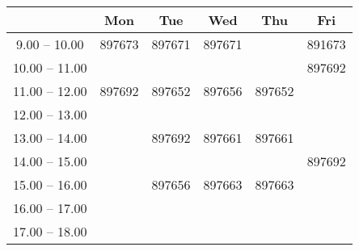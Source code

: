 \documentclass[12pt, a4paper]{article}
\begin{document}
\thispagestyle{empty}
\begin{tabular}{|c|c|c|c|c|c|}
	\hline
	& Mon & Tue & Wed & Thu & Fri \\
	\hline
	9.00 -- 10.00 & 897673 & 897671 & 897671 & & 891673 \\
	\cline{1-1} \cline{4-6}
	10.00 -- 11.00 &&&&& 897692 \\
	\cline{1-5}
	11.00 -- 12.00 & 897692 & 897652 & 897656 & 897652 & \\
	\cline{1-1} \cline{4-4} \cline{6-6}
	12.00 -- 13.00 &&&&& \\
	\hline
	13.00 -- 14.00 && 897692 & 897661 & 897661& \\
	\cline{1-2} \cline{6-6}
	14.00 -- 15.00 &&&&& 897692 \\
	\cline{1-5}
	15.00 -- 16.00 && 897656 & 897663 & 897663 & \\
	\cline{1-2} \cline{5-5}
	16.00 -- 17.00 &&&&& \\
	\cline{1-5}
	17.00 -- 18.00 &&&&& \\
	\hline
\end{tabular}
\end{document}
